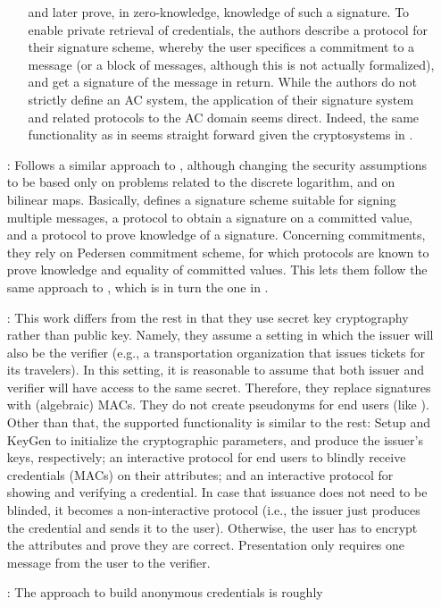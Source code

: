 \begin{enumerate}
\begin{itemize}
    and later prove, in zero-knowledge, knowledge of such a signature. To
    enable private retrieval of credentials, the authors describe a protocol
    for their signature scheme, whereby the user specifices a commitment to
    a message (or a block of messages, although this is not actually
    formalized), and get a signature of the message in return. While the
    authors do not strictly define an AC system, the application of their
    signature system and related protocols to the AC domain seems direct.
    Indeed, the same functionality as in \cite{cl01} seems straight
    forward given the cryptosystems in \cite{cl02}.
  \end{itemize}
\item[\cite{cl04}:] Follows a similar approach to \cite{cl02}, although
  changing the security assumptions to be based only on problems related
  to the discrete logarithm, and on bilinear maps. Basically, defines a
  signature scheme suitable for signing multiple messages, a protocol to
  obtain a signature on a committed value, and a protocol to prove knowledge
  of a signature. Concerning commitments, they rely on Pedersen commitment
  scheme, for which protocols are known to prove knowledge and equality of
  committed values. This lets them follow the same approach to \cite{cl02},
  which is in turn the one in \cite{cl01}.
\item[\cite{cmz14}:] This work differs from the rest in that they use
  secret key cryptography rather than public key. Namely, they assume a
  setting in which the issuer will also be the verifier (e.g., a
  transportation organization that issues tickets for its travelers). In
  this setting, it is reasonable to assume that both issuer and verifier
  will have access to the same secret. Therefore, they replace signatures
  with (algebraic) MACs. They do not create pseudonyms for end users (like
  \cite{sms+19}). Other than that, the supported functionality is similar
  to the rest: Setup and KeyGen to initialize the cryptographic parameters,
  and produce the issuer's keys, respectively; an interactive protocol for
  end users to blindly receive credentials (MACs) on their attributes; and
  an interactive protocol for showing and verifying a credential. In case
  that issuance does not need to be blinded, it becomes a non-interactive
  protocol (i.e., the issuer just produces the credential and sends it to
  the user). Otherwise, the user has to encrypt the attributes and prove
  they are correct. Presentation only requires one message from the user
  to the verifier.
\item[\cite{cdhk15}:] The approach to build anonymous credentials is roughly

\end{enumerate}
